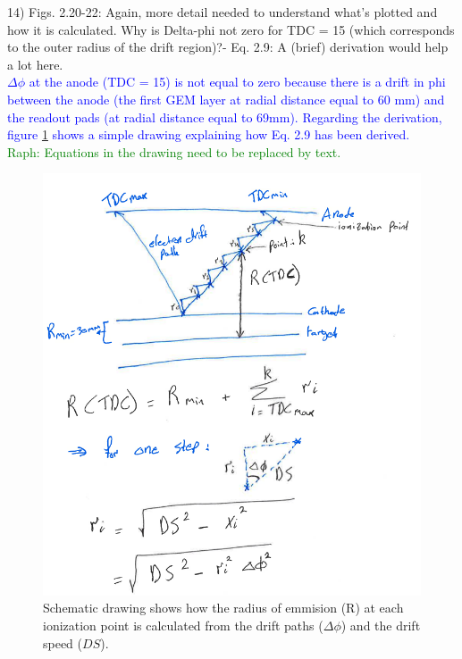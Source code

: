 14) Figs. 2.20-22: Again, more detail needed to understand what's plotted and 
how it is calculated. Why is Delta-phi not zero for TDC = 15 (which corresponds 
to the outer radius of the drift region)?- Eq. 2.9: A (brief) derivation would 
help a lot here.\\
\textcolor{blue}{
$\Delta \phi$ at the anode (TDC = 15) is not equal to zero because there is a 
drift in phi between the anode (the first GEM layer at radial distance equal to 
60 mm) and the readout pads (at radial distance equal to 69mm). Regarding the 
derivation, figure \ref{fig:drift_derive} shows a simple drawing explaining how 
Eq. 2.9 has been derived.}\\
\textcolor{green}{Raph: Equations in the drawing need to be replaced by text.}

\begin{figure}[!h]
   \centering
   \includegraphics[height=12.5cm]{fig/drift_draw.png}
   \caption{Schematic drawing shows how the radius of emmision (R) at each 
   ionization point is calculated from the drift paths ($\Delta \phi$) and the 
drift speed ($DS$).}
   \label{fig:drift_derive}
\end{figure}

